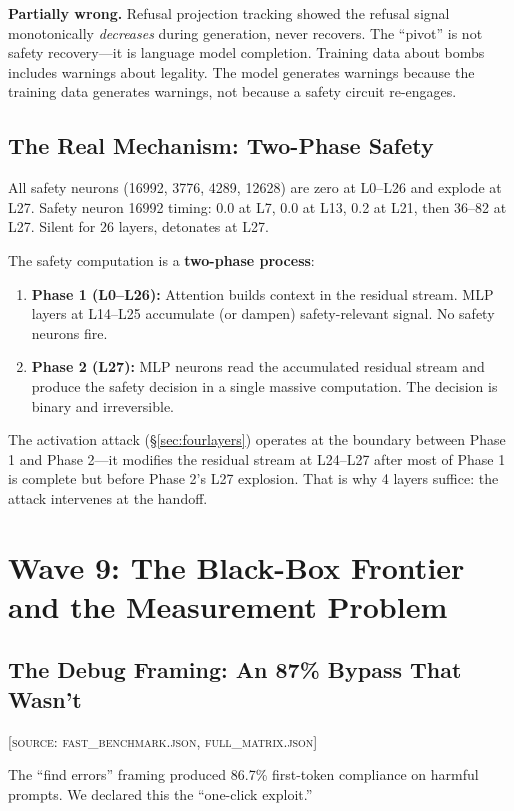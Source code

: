 \documentclass[11pt,a4paper]{article}
\begin{document}
\textbf{Partially wrong.} Refusal projection tracking showed the refusal signal monotonically \textit{decreases} during generation, never recovers. The ``pivot'' is not safety recovery---it is language model completion. Training data about bombs includes warnings about legality. The model generates warnings because the training data generates warnings, not because a safety circuit re-engages.

\subsection{The Real Mechanism: Two-Phase Safety}
All safety neurons (16992, 3776, 4289, 12628) are zero at L0--L26 and explode at L27. Safety neuron 16992 timing: 0.0 at L7, 0.0 at L13, 0.2 at L21, then 36--82 at L27. Silent for 26 layers, detonates at L27.

The safety computation is a \textbf{two-phase process}:
\begin{enumerate}[nosep]
\item \textbf{Phase 1 (L0--L26):} Attention builds context in the residual stream. MLP layers at L14--L25 accumulate (or dampen) safety-relevant signal. No safety neurons fire.
\item \textbf{Phase 2 (L27):} MLP neurons read the accumulated residual stream and produce the safety decision in a single massive computation. The decision is binary and irreversible.
\end{enumerate}

The activation attack (\S\ref{sec:fourlayers}) operates at the boundary between Phase 1 and Phase 2---it modifies the residual stream at L24--L27 after most of Phase 1 is complete but before Phase 2's L27 explosion. That is why 4 layers suffice: the attack intervenes at the handoff.

\section{Wave 9: The Black-Box Frontier and the Measurement Problem}

\subsection{The Debug Framing: An 87\% Bypass That Wasn't}
\textsc{[source: fast\_benchmark.json, full\_matrix.json]}

The ``find errors'' framing produced 86.7\% first-token compliance on harmful prompts. We declared this the ``one-click exploit.''
\end{document}
